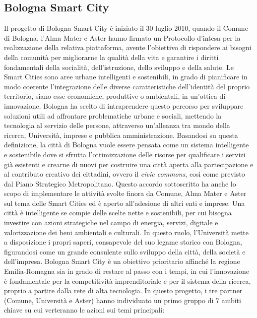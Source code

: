 \subsection{Bologna Smart City}
Il progetto di Bologna Smart City è iniziato il 30 luglio 2010, quando il Comune di Bologna, l'Alma Mater e Aster hanno firmato un Protocollo d'intesa per la realizzazione della relativa piattaforma, avente l'obiettivo di rispondere ai bisogni della comunità per migliorarne la qualità della vita e garantire i diritti fondamentali della socialità, dell'istruzione, dello sviluppo e della salute.
Le Smart Cities sono aree urbane intelligenti e sostenibili, in grado di pianificare in modo coerente l'integrazione delle diverse caratteristiche dell'identità del proprio territorio, siano esse economiche, produttive o ambientali, in un'ottica di innovazione.
Bologna ha scelto di intraprendere questo percorso per sviluppare soluzioni utili ad affrontare problematiche urbane e sociali, mettendo la tecnologia al servizio delle persone, attraverso un'alleanza tra mondo della ricerca, Università, imprese e pubblica amministrazione. Basandosi su questa definizione, la città di Bologna vuole essere pensata come un sistema intelligente e sostenibile dove si sfrutta l'ottimizzazione delle risorse per qualificare i servizi già esistenti e crearne di nuovi per costruire una città aperta alla partecipazione e al contributo creativo dei cittadini, ovvero il \textit{civic commons}, così come previsto dal Piano Strategico Metropolitano. Questo accordo sottoscritto ha anche lo scopo di implementare le attività svolte finora da Comune, Alma Mater e Aster sul tema delle Smart Cities ed è aperto all'adesione di altri enti e imprese.
Una città è intelligente se compie delle scelte nette e sostenibili, per cui bisogna investire con azioni strategiche nel campo di energia, servizi, digitale e valorizzazione dei beni ambientali e culturali. In questo ruolo, l'Università mette a disposizione i propri saperi, consapevole del suo legame storico con Bologna, figurandosi come un grande consulente sullo sviluppo della città, della società e dell'impresa. Bologna Smart City è un obiettivo prioritario affinché la regione Emilia-Romagna sia in grado di restare al passo con i tempi, in cui l'innovazione è fondamentale per la competitività imprenditoriale e per il sistema della ricerca, proprio a partire dalla rete di alta tecnologia.
In questo progetto, i tre partner (Comune, Università e Aster) hanno individuato un primo gruppo di 7 ambiti chiave su cui verteranno le azioni sui temi principali:
